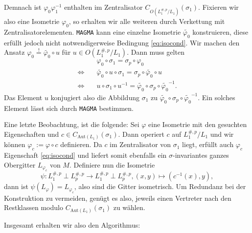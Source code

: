 \documentclass[12pt,a4paper,halfparskip,headsepline,bibtotocnumbered]{scrreprt}
\theoremstyle{nummermitklammern}
\theoremstyle{nonumberbreak}
\begin{document}
Demnach ist $\varphi_0 \varphi_1^{-1}$ enthalten im Zentralisator $C_{O(L_1^{\#,p} / L_1)}(\sigma_1)$. Fixieren wir also eine Isometrie $\varphi_0$, so erhalten wir alle weiteren durch Verkettung mit Zentralisatorelementen. \texttt{MAGMA} kann eine einzelne Isometrie $\tilde{\varphi_0}$ konstruieren, diese erfüllt jedoch nicht notwendigerweise Bedingung \eqref{eq:isocond}. Wir machen den Ansatz $\varphi_0 \stackrel{!}{=} \tilde{\varphi_0} \circ u$ für $u \in O(L_1^{\#,p}/L_1)$. Dann muss gelten
\begin{align*}
	&\quad\varphi_0 \circ \sigma_1 = \sigma_p \circ \varphi_0\\
	\Leftrightarrow& \quad\tilde{\varphi_0} \circ u \circ \sigma_1 = \sigma_p \circ \tilde{\varphi_0} \circ u \\
	\Leftrightarrow& \quad u \circ \sigma_1 \circ u^{-1} = \tilde{\varphi_0} \circ \sigma_p \circ \tilde{\varphi_0}^{-1}.
\end{align*}
Das Element $u$ konjugiert also die Abbildung $\sigma_1$ zu $\tilde{\varphi_0} \circ \sigma_p \circ \tilde{\varphi_0}^{-1}$. Ein solches Element lässt sich durch \texttt{MAGMA} bestimmen.\par
Eine letzte Beobachtung, ist die folgende: Sei $\varphi$ eine Isometrie mit den gesuchten Eigenschaften und $c \in C_{\text{Aut}(L_1)}(\sigma_1)$. Dann operiert $c$ auf $L_1^{\#,p} / L_1$ und wir können $\varphi_c := \varphi \circ c$ definieren. Da $c$ im Zentralisator von $\sigma_1$ liegt, erfüllt auch $\varphi_c$ Eigenschaft \eqref{eq:isocond} und liefert somit ebenfalls ein $\sigma$-invariantes ganzes Obergitter $L_{\varphi_c}$ von $M$. Definiere nun die Isometrie
\begin{equation*}
	\psi : L_1^{\#,p} \perp L_p^{\#,p} \rightarrow L_1^{\#,p} \perp L_p^{\#,p}, (x, y) \mapsto ( c^{-1}(x), y),
\end{equation*}
dann ist $\psi(L_\varphi) = L_{\varphi_c}$, also sind die Gitter isometrisch. Um Redundanz bei der Konstruktion zu vermeiden, genügt es also, jeweils einen Vertreter nach den Restklassen modulo $C_{\text{Aut}(L_1)}(\sigma_1)$ zu wählen.\par
Insgesamt erhalten wir also den Algorithmus:
\end{document}
